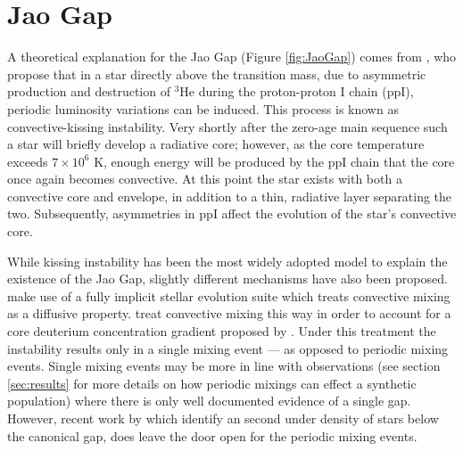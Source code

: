 \section{Jao Gap}\label{sec:JaoGap}
A theoretical explanation for the Jao Gap (Figure \ref{fig:JaoGap}) comes from
\citet{van2012}, who propose that in a star directly above the transition mass,
due to asymmetric production and destruction of $^{3}$He during the
proton-proton I chain (ppI), periodic luminosity variations can be induced.
This process is known as convective-kissing instability. Very shortly after the
zero-age main sequence such a star will briefly develop a radiative core;
however, as the core temperature exceeds $7\times 10^{6}$ K, enough energy will
be produced by the ppI chain that the core once again becomes convective. At
this point the star exists with both a convective core and envelope, in
addition to a thin, radiative layer separating the two. Subsequently,
asymmetries in ppI affect the evolution of the star's convective core.

While kissing instability has been the most widely adopted model to
explain the existence of the Jao Gap, slightly different mechanisms have also
been proposed. \citet{MacDonald2018} make use of a fully implicit stellar
evolution suite which treats convective mixing as a diffusive property.
\citeauthor{MacDonald2018} treat convective mixing this way in order to account
for a core deuterium concentration gradient proposed by \citet{Baraffe1997}.
Under this treatment the instability results only in a single mixing event ---
as opposed to periodic mixing events. Single mixing events may be more in line with
observations (see section \ref{sec:results} for more details on how periodic
mixings can effect a synthetic population) where there is only well documented
evidence of a single gap. However, recent work by \citet{Jao2021} which
identify an second under density of stars below the canonical gap, does leave
the door open for the periodic mixing events.

